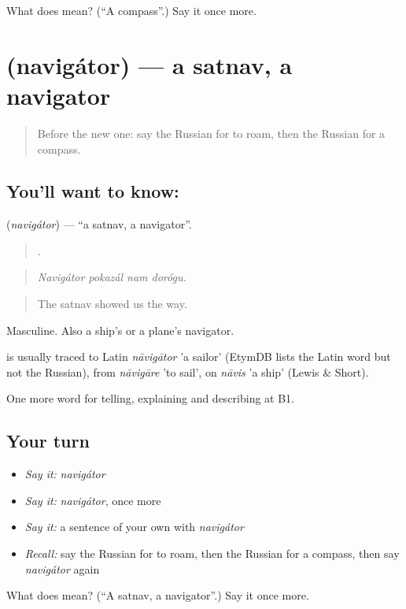 \begin{tcolorbox}[breakable,colback=teal!4,colframe=teal!35!black,title={Before you move on}]
What does  mean? (\textquotedblleft{}A compass\textquotedblright{}.) Say it once more.
\end{tcolorbox}
\section[\texorpdfstring{\ru{навигатор} (navigátor)}{навигатор (navigátor)}]{ (navigátor) — a satnav, a navigator}

\label{lesson:RU-C437-navigator}



\begin{quote}
Before the new one: say the Russian for to roam, then the Russian for a compass.
\end{quote}

\subsection*{You'll want to know: }
\textbf{} (\emph{navigátor}) — \textquotedblleft{}a satnav, a navigator\textquotedblright{}.

\begin{quote}
   .
\end{quote}

\begin{quote}
\emph{Navigátor pokazál nam dorógu.}
\end{quote}

\begin{quote}
The satnav showed us the way.
\end{quote}

Masculine. Also a ship's or a plane's navigator.

\begin{cousinweb}
\emph{} is usually traced to Latin \emph{nāvigātor} 'a sailor' (EtymDB lists the Latin word but not the Russian), from \emph{nāvigāre} 'to sail', on \emph{nāvis} 'a ship' (Lewis \& Short).
\end{cousinweb}

\begin{grammarlens}[title={What you've built}]
One more word for telling, explaining and describing at B1.
\end{grammarlens}

\subsection*{Your turn}
\begin{itemize}
\raggedright
  \item \emph{Say it:} \emph{navigátor}
  \item \emph{Say it:} \emph{navigátor}, once more
  \item \emph{Say it:} a sentence of your own with \emph{navigátor}
  \item \emph{Recall:} say the Russian for to roam, then the Russian for a compass, then say \emph{navigátor} again
\end{itemize}

\begin{tcolorbox}[breakable,colback=teal!4,colframe=teal!35!black,title={Before you move on}]
What does  mean? (\textquotedblleft{}A satnav, a navigator\textquotedblright{}.) Say it once more.
\end{tcolorbox}
